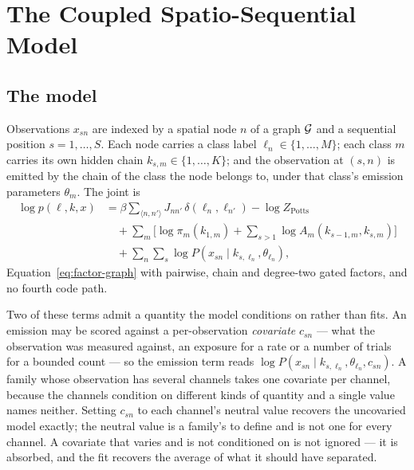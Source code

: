 \documentclass[11pt,a4paper]{article}
\begin{document}
\section{The Coupled Spatio-Sequential Model}
\label{sec:coupled}

\subsection{The model}
\label{sec:coupled:model}
Observations $x_{sn}$ are indexed by a spatial node $n$ of a graph $\mathcal{G}$ and
a sequential position $s = 1, \dots, S$. Each node carries a class label
$\ell_n \in \{1, \dots, M\}$; each class $m$ carries its own hidden chain
$k_{s,m} \in \{1, \dots, K\}$; and the observation at $(s, n)$ is emitted by
the chain of the class the node belongs to, under that class's emission
parameters $\theta_m$. The joint is
\begin{equation}
  \begin{split}
    \log p(\ell, k, x)
      &= \beta \sum_{\langle n,n' \rangle} J_{nn'}\,
         \delta(\ell_n, \ell_{n'}) - \log Z_{\mathrm{Potts}} \\
      &\quad + \sum_m \Big[ \log \pi_m(k_{1,m})
         + \sum_{s > 1} \log A_m(k_{s-1,m}, k_{s,m}) \Big] \\
      &\quad + \sum_n \sum_s
         \log P(x_{sn} \mid k_{s,\ell_n}, \theta_{\ell_n}),
  \end{split}
  \label{eq:joint}
\end{equation}
Equation~\ref{eq:factor-graph} with pairwise, chain and degree-two gated
factors, and no fourth code path.

Two of these terms admit a quantity the model conditions on rather than fits.
An emission may be scored against a per-observation \emph{covariate}
$c_{sn}$ --- what the observation was measured against, an exposure for a rate
or a number of trials for a bounded count --- so the emission term reads
$\log P(x_{sn} \mid k_{s,\ell_n}, \theta_{\ell_n}, c_{sn})$. A family whose
observation has several channels takes one covariate per channel, because the
channels condition on different kinds of quantity and a single value names
neither. Setting $c_{sn}$ to each channel's neutral value recovers the
uncovaried model exactly; the neutral value is a family's to define and is not
one for every channel. A covariate that varies and is not conditioned on is
not ignored --- it is absorbed, and the fit recovers the average of what it
should have separated.
\end{document}
